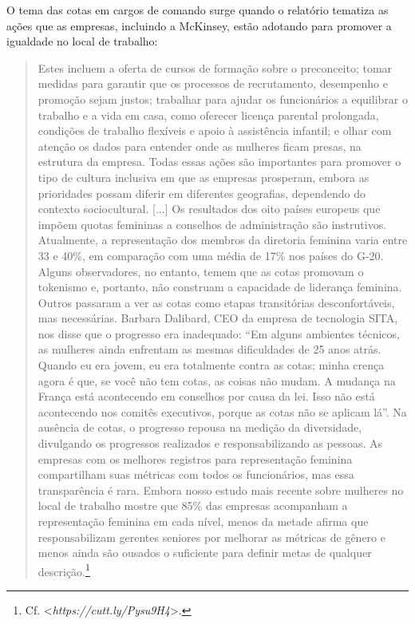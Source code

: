 O tema das cotas em cargos de comando surge quando o relatório tematiza
as ações que as empresas, incluindo a McKinsey, estão adotando para
promover a igualdade no local de trabalho:

\begin{quote}
Estes incluem a oferta de cursos de formação sobre o preconceito; tomar
medidas para garantir que os processos de recrutamento, desempenho e
promoção sejam justos; trabalhar para ajudar os funcionários a
equilibrar o trabalho e a vida em casa, como oferecer licença parental
prolongada, condições de trabalho flexíveis e apoio à assistência
infantil; e olhar com atenção os dados para entender onde as mulheres
ficam presas, na estrutura da empresa. Todas essas ações são importantes
para promover o tipo de cultura inclusiva em que as empresas prosperam,
embora as prioridades possam diferir em diferentes geografias,
dependendo do contexto sociocultural. {[}...{]} Os resultados dos oito
países europeus que impõem quotas femininas a conselhos de administração
são instrutivos. Atualmente, a representação dos membros da diretoria
feminina varia entre 33 e 40\%, em comparação com uma média de 17\% nos
países do G-20. Alguns observadores, no entanto, temem que as cotas
promovam o tokenismo e, portanto, não construam a capacidade de
liderança feminina. Outros passaram a ver as cotas como etapas
transitórias desconfortáveis, mas necessárias. Barbara Dalibard, CEO da
empresa de tecnologia SITA, nos disse que o progresso era inadequado:
``Em alguns ambientes técnicos, as mulheres ainda enfrentam as mesmas
dificuldades de 25 anos atrás. Quando eu era jovem, eu era totalmente
contra as cotas; minha crença agora é que, se você não tem cotas, as
coisas não mudam. A mudança na França está acontecendo em conselhos por
causa da lei. Isso não está acontecendo nos comitês executivos, porque
as cotas não se aplicam lá''. Na ausência de cotas, o progresso repousa
na medição da diversidade, divulgando os progressos realizados e
responsabilizando as pessoas. As empresas com os melhores registros para
representação feminina compartilham suas métricas com todos os
funcionários, mas essa transparência é rara. Embora nosso estudo mais
recente sobre mulheres no local de trabalho mostre que 85\% das empresas
acompanham a representação feminina em cada nível, menos da metade
afirma que responsabilizam gerentes seniores por melhorar as métricas de
gênero e menos ainda são ousados ​​o suficiente para definir metas de
qualquer descrição.\footnote{Cf.
  \textless{}\emph{https://cutt.ly/Pysu9H4}\textgreater{}.}
\end{quote}

